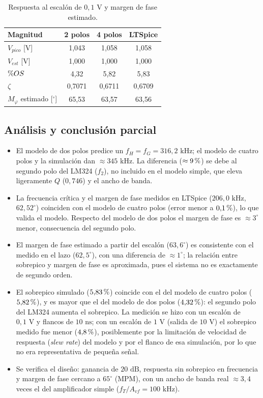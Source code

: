 \begin{table}[H]
\centering
\caption{Respuesta al escalón de $0{,}1\text{ V}$ y margen de fase estimado.}
\label{tab:escalon_c1}
\begin{tabular}{lccc}
\toprule
\textbf{Magnitud} & \textbf{2 polos} & \textbf{4 polos} & \textbf{LTSpice} \\
\midrule
$V_{pico}$ [V] & 1,043 & 1,058 & 1,058 \\
$V_{est}$ [V] & 1,000 & 1,000 & 1,000 \\
$\mathrm{\char37}OS$ & 4,32 & 5,82 & 5,83 \\
$\zeta$ & 0,7071 & 0,6711 & 0,6709 \\
$M_\varphi$ estimado [$^\circ$] & 65,53 & 63,57 & 63,56 \\
\bottomrule
\end{tabular}
\end{table}


\subsection{Análisis y conclusión parcial}
\label{sec:concl_c1}

\begin{itemize}
    \item El modelo de dos polos predice un $f_H = f_G = 316{,}2\text{ kHz}$; el modelo de cuatro polos y la simulación dan $\approx 345\text{ kHz}$. La diferencia ($\approx 9\,\mathrm{\char37}$) se debe al segundo polo del LM324 ($f_2$), no incluido en el modelo simple, que eleva ligeramente $Q$ ($0{,}746$) y el ancho de banda.
    \item La frecuencia crítica y el margen de fase medidos en LTSpice ($206{,}0\text{ kHz}$, $62{,}52^\circ$) coinciden con el modelo de cuatro polos (error menor a $0{,}1\,\mathrm{\char37}$), lo que valida el modelo. Respecto del modelo de dos polos el margen de fase es $\approx 3^\circ$ menor, consecuencia del segundo polo.
    \item El margen de fase estimado a partir del escalón ($63{,}6^\circ$) es consistente con el medido en el lazo ($62{,}5^\circ$), con una diferencia de $\approx 1^\circ$; la relación entre sobrepico y margen de fase es aproximada, pues el sistema no es exactamente de segundo orden.
    \item El sobrepico simulado ($5{,}83\,\mathrm{\char37}$) coincide con el del modelo de cuatro polos ($5{,}82\,\mathrm{\char37}$), y es mayor que el del modelo de dos polos ($4{,}32\,\mathrm{\char37}$): el segundo polo del LM324 aumenta el sobrepico. La medición se hizo con un escalón de $0{,}1\text{ V}$ y flancos de $10\text{ ns}$; con un escalón de $1\text{ V}$ (salida de $10\text{ V}$) el sobrepico medido fue menor ($4{,}8\,\mathrm{\char37}$), posiblemente por la limitación de velocidad de respuesta (\emph{slew rate}) del modelo y por el flanco de esa simulación, por lo que no era representativa de pequeña señal.
    \item Se verifica el diseño: ganancia de $20\text{ dB}$, respuesta sin sobrepico en frecuencia y margen de fase cercano a $65^\circ$ (MPM), con un ancho de banda real $\approx 3{,}4$ veces el del amplificador simple ($f_T/A_{vf} = 100\text{ kHz}$).
\end{itemize}
